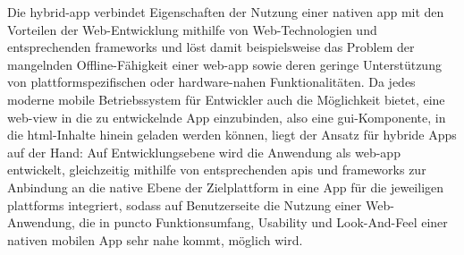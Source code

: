 Die \gls{hybrid-app} verbindet Eigenschaften der Nutzung einer nativen \gls{app} mit den Vorteilen der Web-Entwicklung mithilfe von Web-Technologien und entsprechenden \glspl{framework} und löst damit beispielsweise das Problem der mangelnden Offline-Fähigkeit einer \gls{web-app} sowie deren geringe Unterstützung von plattformspezifischen oder hardware-nahen Funktionalitäten. 
Da jedes moderne mobile Betriebssystem für Entwickler auch die Möglichkeit bietet, eine \gls{web-view} in die zu entwickelnde App einzubinden, also eine \gls{gui}-Komponente, in die \gls{html}-Inhalte hinein geladen werden können, liegt der Ansatz für hybride Apps auf der Hand: Auf Entwicklungsebene wird die Anwendung als \gls{web-app} entwickelt, gleichzeitig mithilfe von entsprechenden \glspl{api} und \glspl{framework} zur Anbindung an die native Ebene der Zielplattform in eine App für die jeweiligen \glspl{plattform} integriert, sodass auf Benutzerseite die Nutzung einer Web-Anwendung, die in puncto Funktionsumfang, Usability und Look-And-Feel einer nativen mobilen App sehr nahe kommt, möglich wird.

